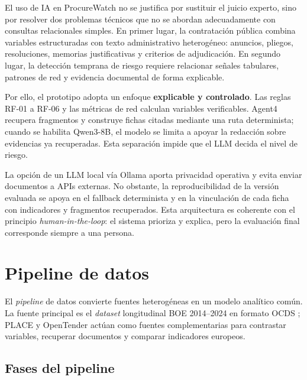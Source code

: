 \documentclass[11pt,a4paper,spanish]{book}
\numberwithin{equation}{chapter}
\numberwithin{figure}{chapter}
\begin{document}
El uso de IA en ProcureWatch no se justifica por sustituir el juicio experto, sino por resolver dos problemas t{\'e}cnicos que no se abordan adecuadamente con consultas relacionales simples. En primer lugar, la contrataci{\'o}n p{\'u}blica combina variables estructuradas con texto administrativo heterog{\'e}neo: anuncios, pliegos, resoluciones, memorias justificativas y criterios de adjudicaci{\'o}n. En segundo lugar, la detecci{\'o}n temprana de riesgo requiere relacionar se{\~n}ales tabulares, patrones de red y evidencia documental de forma explicable.

Por ello, el prototipo adopta un enfoque \textbf{explicable y controlado}. Las reglas RF-01 a RF-06 y las m{\'e}tricas de red calculan variables verificables. Agent4 recupera fragmentos y construye fichas citadas mediante una ruta determinista; cuando se habilita Qwen3-8B, el modelo se limita a apoyar la redacci{\'o}n sobre evidencias ya recuperadas. Esta separaci{\'o}n impide que el LLM decida el nivel de riesgo.

La opci{\'o}n de un LLM local v{\'i}a Ollama aporta privacidad operativa y evita enviar documentos a APIs externas. No obstante, la reproducibilidad de la versi{\'o}n evaluada se apoya en el fallback determinista y en la vinculaci{\'o}n de cada ficha con indicadores y fragmentos recuperados. Esta arquitectura es coherente con el principio \textit{human-in-the-loop}: el sistema prioriza y explica, pero la evaluaci{\'o}n final corresponde siempre a una persona.

\section{Pipeline de datos}
\label{sec:pipeline_datos}

El \textit{pipeline} de datos convierte fuentes heterog{\'e}neas en un modelo anal{\'i}tico com{\'u}n. La fuente principal es el \textit{dataset} longitudinal BOE 2014--2024 en formato OCDS \cite{MunozPla2026}; PLACE y OpenTender act{\'u}an como fuentes complementarias para contrastar variables, recuperar documentos y comparar indicadores europeos.

\subsection{Fases del pipeline}
\end{document}

